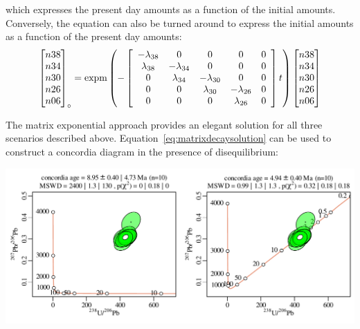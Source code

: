 \begin{refsection}
\noindent which expresses the present day amounts as a function of the
initial amounts. Conversely, the equation can also be turned around to
express the initial amounts as a function of the present day amounts:
\begin{equation}
  \left[
    \begin{array}{@{}c@{}}
      n38\\
      n34\\
      n30\\
      n26\\
      n06
    \end{array}
  \right]_\circ
  =
  \mbox{expm}\left(
      -
  \left[
    \begin{array}{ccccc}
      -\lambda_{38} & 0 & 0 & 0 & 0 \\
      \lambda_{38} & -\lambda_{34} & 0 & 0 & 0 \\
      0 & \lambda_{34} & -\lambda_{30} & 0 & 0 \\
      0 & 0 & \lambda_{30} & -\lambda_{26} & 0 \\
      0 & 0 & 0 & \lambda_{26} & 0\\
    \end{array}
    \right]
  t
  \right)
  \left[
    \begin{array}{@{}c@{}}
      n38\\
      n34\\
      n30\\
      n26\\
      n06
    \end{array}
    \right]
  \label{eq:matrixdecaysolutioninverse}
\end{equation}

The matrix exponential approach provides an elegant solution for all
three scenarios described above. Equation~\ref{eq:matrixdecaysolution}
can be used to construct a concordia diagram in the presence of
disequilibrium:

\noindent\includegraphics[width=\linewidth]{../figures/diseq.pdf}
\begingroup
{}
\label{fig:diseq}
\endgroup


\end{refsection}
